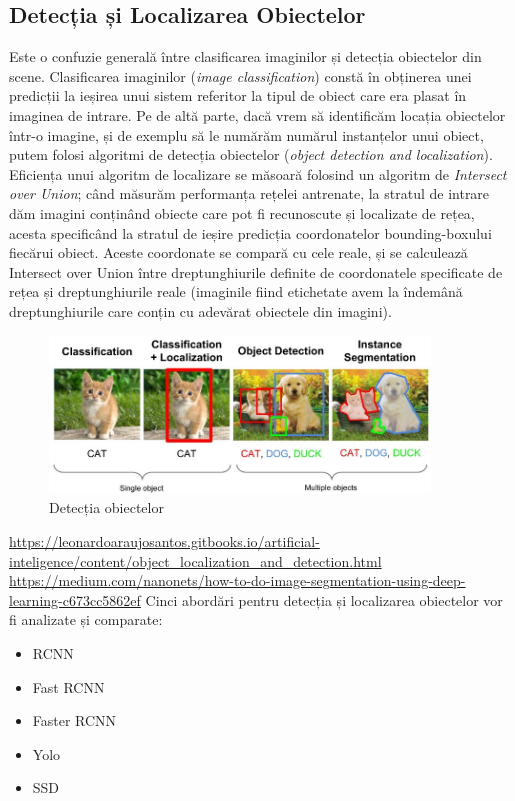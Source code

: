 \subsection{Detecția și Localizarea Obiectelor}
Este o confuzie generală între clasificarea imaginilor și detecția obiectelor din scene. Clasificarea imaginilor (\textit{image classification}) constă în obținerea unei predicții la ieșirea unui sistem referitor la tipul de obiect care era plasat în imaginea de intrare. Pe de altă parte, dacă vrem să identificăm locația obiectelor într-o imagine, și de exemplu să le numărăm numărul instanțelor unui obiect, putem folosi algoritmi de detecția obiectelor (\textit{object detection and localization}).\newline
Eficiența unui algoritm de localizare se măsoară folosind un algoritm de \textit{Intersect over Union}; când măsurăm performanța rețelei antrenate, la stratul de intrare dăm imagini conținând obiecte care pot fi recunoscute și localizate de rețea, acesta specificând la stratul de ieșire predicția coordonatelor bounding-boxului fiecărui obiect. Aceste coordonate se compară cu cele reale, și se calculează Intersect over Union între dreptunghiurile definite de coordonatele specificate de rețea și dreptunghiurile reale (imaginile fiind etichetate avem la îndemână dreptunghiurile care conțin cu adevărat obiectele din imagini).
\begin{figure}[h!]
    	\centering
	\captionsetup{justification=centering, margin=2cm}
	\includegraphics[width=0.9\textwidth]{figures/class_detect_segment.jpeg}
	\caption{Detecția obiectelor \cite{class_detect_segment}}
	\label{fig:class_detect_segment}
\end{figure}

\url{https://leonardoaraujosantos.gitbooks.io/artificial-inteligence/content/object_localization_and_detection.html}
\url{https://medium.com/nanonets/how-to-do-image-segmentation-using-deep-learning-c673cc5862ef}
Cinci abordări pentru detecția și localizarea obiectelor vor fi analizate și comparate:
\begin{itemize}
	\item RCNN
	\item Fast RCNN
	\item Faster RCNN
	\item Yolo
	\item SSD
\end{itemize}

